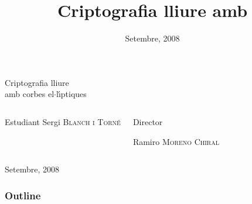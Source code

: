 \documentclass{beamer}
\title{Criptografia lliure amb \ces{}}
\date{Setembre, 2008}
\def\lgem{l\ensuremath{\cdot}l}
\def\ce{corba e\lgem{}\'{\i}ptica}%
\def\ces{corbes e\lgem{}\'{\i}ptiques}%
\def\Cfs{Cossos finits}%
\theoremstyle{saltolinea}   			%
\begin{document}
\begin{frame}
  \begin{block}{}
    \begin{huge}\begin{center}Criptografia lliure\\ amb \ces{}\end{center}\end{huge}
  \end{block}
  \begin{columns}[t]
      \begin{block}{Estudiant}
         Sergi \textsc{Blanch i Torn\'e}
      \end{block}
      \begin{block}{\begin{flushright}Director\end{flushright}}
         \begin{flushright}Ramiro \textsc{Moreno Chiral}\end{flushright}
      \end{block}
  \end{columns}
  \begin{center}
    Setembre, 2008
  \end{center}
\end{frame}

\begin{frame}
  \frametitle{Outline}
  \transdissolve
  \tableofcontents[hideallsubsections]
\end{frame}




\end{document}
